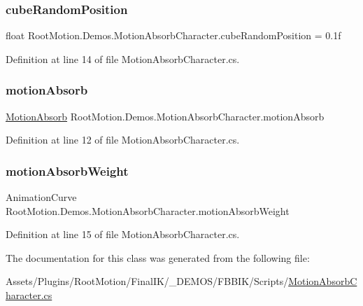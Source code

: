 \subsubsection{\texorpdfstring{cube\+Random\+Position}{cubeRandomPosition}}
{\footnotesize\ttfamily float Root\+Motion.\+Demos.\+Motion\+Absorb\+Character.\+cube\+Random\+Position = 0.\+1f}



Definition at line 14 of file Motion\+Absorb\+Character.\+cs.

\mbox{\label{class_root_motion_1_1_demos_1_1_motion_absorb_character_a9d751709f93f6ee580cbcba011a688ae}} 
\subsubsection{\texorpdfstring{motion\+Absorb}{motionAbsorb}}
{\footnotesize\ttfamily \mbox{\hyperlink{class_root_motion_1_1_demos_1_1_motion_absorb}{Motion\+Absorb}} Root\+Motion.\+Demos.\+Motion\+Absorb\+Character.\+motion\+Absorb}



Definition at line 12 of file Motion\+Absorb\+Character.\+cs.

\mbox{\label{class_root_motion_1_1_demos_1_1_motion_absorb_character_a561323d06ca0c2c511a0b6a03c8d534c}} 
\subsubsection{\texorpdfstring{motion\+Absorb\+Weight}{motionAbsorbWeight}}
{\footnotesize\ttfamily Animation\+Curve Root\+Motion.\+Demos.\+Motion\+Absorb\+Character.\+motion\+Absorb\+Weight}



Definition at line 15 of file Motion\+Absorb\+Character.\+cs.



The documentation for this class was generated from the following file\+:\begin{DoxyCompactItemize}
\item 
Assets/\+Plugins/\+Root\+Motion/\+Final\+I\+K/\+\_\+\+D\+E\+M\+O\+S/\+F\+B\+B\+I\+K/\+Scripts/\mbox{\hyperlink{_motion_absorb_character_8cs}{Motion\+Absorb\+Character.\+cs}}\end{DoxyCompactItemize}
